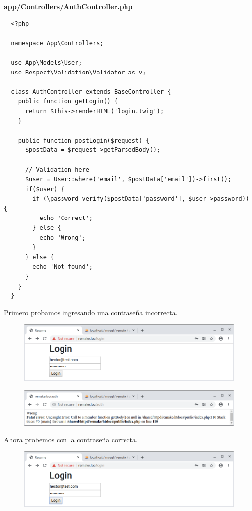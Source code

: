\documentclass{article}
\begin{document}
\textbf{app/Controllers/AuthController.php}
\begin{verbatim}
  <?php

  namespace App\Controllers;

  use App\Models\User;
  use Respect\Validation\Validator as v;

  class AuthController extends BaseController {
    public function getLogin() {
      return $this->renderHTML('login.twig');
    }

    public function postLogin($request) {
      $postData = $request->getParsedBody();

      // Validation here
      $user = User::where('email', $postData['email'])->first();
      if($user) {
        if (\password_verify($postData['password'], $user->password)) {
          echo 'Correct';
        } else {
          echo 'Wrong';
        }
      } else {
        echo 'Not found';
      }
    }
  }
\end{verbatim}

Primero probamos ingresando una contraseña incorrecta.

\begin{figure}[h!]
  \centering
  \includegraphics[scale=0.5]{./Pictures/202_login_incorrect.png}
\end{figure}

\begin{figure}[h!]
  \centering
  \includegraphics[scale=0.5]{./Pictures/203_login_wrong.png}
\end{figure}

Ahora probemos con la contraseña correcta.

\begin{figure}[h!]
  \centering
  \includegraphics[scale=0.5]{./Pictures/204_login_correct.png}
\end{figure}
\end{document}

